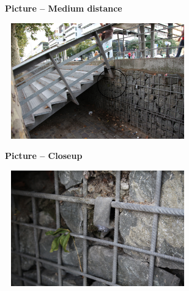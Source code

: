 \documentclass[11pt,twoside,a4paper]{article}
\begin{document}
\begin{minipage}[ht]{0.45\textwidth}
	\textbf{Picture -- Medium distance}
	\begin{center} \includegraphics[width=8.00cm, height=5.00cm]{img/781-871817.jpg} \end{center}
\end{minipage} \hfill \begin{minipage}[ht]{0.45\textwidth}
	\textbf{Picture -- Closeup}
	\begin{center} \includegraphics[width=8.00cm, height=5.00cm]{img/781-349845.jpg} \end{center}
\end{minipage}

\clearpage %
\end{document}
